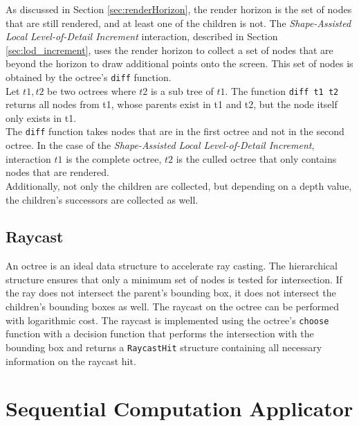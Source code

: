 As discussed in Section \ref{sec:renderHorizon}, the render horizon is the set of nodes that are still rendered, and at least one of the children is not. The \textit{Shape-Assisted Local Level-of-Detail Increment} interaction, described in Section \ref{sec:lod_increment}, uses the render horizon to collect a set of nodes that are beyond the horizon to draw additional points onto the screen. This set of nodes is obtained by the octree's \verb|diff| function. 
\\
Let $t1, t2$ be two octrees where $t2$ is a sub tree of $t1$. The function \verb|diff t1 t2| returns all nodes from t1, whose parents exist in t1 and t2, but the node itself only exists in t1.
\\
The \verb|diff| function takes nodes that are in the first octree and not in the second octree. In the case of the \textit{Shape-Assisted Local Level-of-Detail Increment}, interaction $t1$ is the complete octree, $t2$ is the culled octree that only contains nodes that are rendered. 
\\
Additionally, not only the children are collected, but depending on a depth value, the children's successors are collected as well. 


\subsection{Raycast}

An octree is an ideal data structure to accelerate ray casting. The hierarchical structure ensures that only a minimum set of nodes is tested for intersection. If the ray does not intersect the parent's bounding box, it does not intersect the children's bounding boxes as well. The raycast on the octree can be performed with logarithmic cost. The raycast is implemented using the octree's \verb|choose| function with a decision function that performs the intersection with the bounding box and returns a \verb|RaycastHit| structure containing all necessary information on the raycast hit. 


\section{Sequential Computation Applicator}

